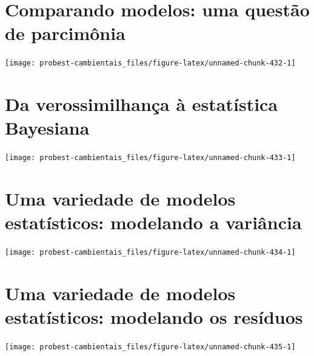 \documentclass[
]{book}
\begin{document}
\hypertarget{aic}{%
\chapter{Comparando modelos: uma questão de parcimônia}\label{aic}}

\begin{center}\texttt{[image: probest-cambientais\_files/figure-latex/unnamed-chunk-432-1]} \end{center}

\hypertarget{statbayes}{%
\chapter{Da verossimilhança à estatística Bayesiana}\label{statbayes}}

\begin{center}\texttt{[image: probest-cambientais\_files/figure-latex/unnamed-chunk-433-1]} \end{center}

\hypertarget{varmodels}{%
\chapter{Uma variedade de modelos estatísticos: modelando a variância}\label{varmodels}}

\begin{center}\texttt{[image: probest-cambientais\_files/figure-latex/unnamed-chunk-434-1]} \end{center}

\hypertarget{nindep}{%
\chapter{Uma variedade de modelos estatísticos: modelando os resíduos}\label{nindep}}

\begin{center}\texttt{[image: probest-cambientais\_files/figure-latex/unnamed-chunk-435-1]} \end{center}

  
\end{document}
